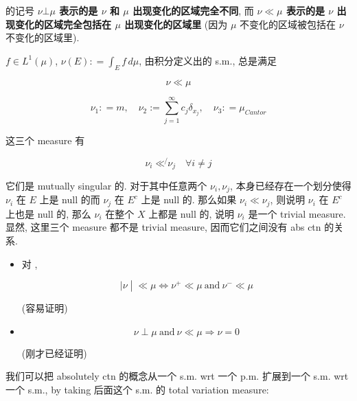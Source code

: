  的记号 \textbf{\(\nu\bot\mu\) 表示的是 \(\nu\) 和 \(\mu\) 出现变化的区域完全不同}, 而 \textbf{\(\nu \ll \mu\) 表示的是 \(\nu\) 出现变化的区域完全包括在 \(\mu\) 出现变化的区域里} (因为 \(\mu\) 不变化的区域被包括在 \(\nu\) 不变化的区域里).

\begin{example}

\(f \in L^{1}(\mu)\), \(\nu(E): = \int_{E}f\, d\mu\), 由积分定义出的 s.m., 总是满足

\[\nu \ll \mu\]

\end{example}

\begin{example}

\[\nu_{1}: = m,\quad\nu_{2} := \sum\limits_{j = 1}^{\infty}c_{j}\delta_{x_{j}},\quad\nu_{3}: = \mu_{Cantor}\]

这三个 measure 有

\[\nu_{i}\ll\not{}\nu_{j}\quad\forall i \neq j\]

它们是 mutually singular 的. 对于其中任意两个 \(\nu_{i},\nu_{j}\), 本身已经存在一个划分使得 \(\nu_{i}\) 在 \(E\) 上是 null 的而 \(\nu_{j}\) 在 \(E^{c}\) 上是 null 的. 那么如果 \(\nu_{i} \ll \nu_{j}\), 则说明 \(\nu_{i}\) 在 \(E^{c}\) 上也是 null 的, 那么 \(\nu_{i}\) 在整个 \(X\) 上都是 null 的, 说明 \(\nu_{i}\) 是一个 trivial measure.\\
显然, 这里三个 measure 都不是 trivial measure, 因而它们之间没有 abs ctn 的关系.

\end{example}

\begin{proposition}{}

\begin{itemize}
\item
  对 ,

  \[\left. |\nu \middle| \ll \mu\Leftrightarrow\nu^{+} \ll \mu\ \text{and}\ \nu^{-} \ll \mu \right.\]

  (容易证明)
\item
  \[\nu \perp \mu\ \text{and}\ \nu \ll \mu\Longrightarrow\nu = 0\]

  (刚才已经证明)
\end{itemize}

\end{proposition}

我们可以把 absolutely ctn 的概念从一个 s.m. wrt 一个 p.m. 扩展到一个 s.m. wrt 一个 s.m., by taking 后面这个 s.m. 的 total variation measure:

